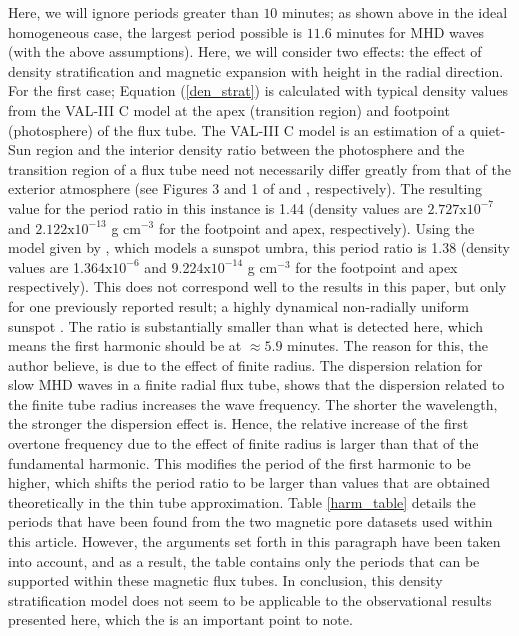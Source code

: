 	Here, we will ignore periods greater than $10$ minutes; as shown above in the ideal homogeneous case, the largest period possible is $11.6$ minutes for MHD waves (with the above assumptions).
	Here, we will consider two effects: the effect of density stratification and magnetic expansion with height in the radial direction.
	For the first case; Equation (\ref{den_strat}) is calculated with typical density values from the VAL-III C model \citep{1981ApJS...45..635V} at the apex (transition region) and footpoint (photosphere) of the flux tube.
	The VAL-III C model is an estimation of a quiet-Sun region and the interior density ratio between the photosphere and the transition region of a flux tube need not necessarily differ greatly from that of the exterior atmosphere (see Figures 3 and 1 of \citealp{GFME13a} and \citealp{GFE14}, respectively). 
	The resulting value for the period ratio in this instance is 1.44 (density values are $2.727\mathrm{x}10^{-7}$ and $2.122\mathrm{x}10^{-13}$ g cm$^{-3}$ for the footpoint and apex, respectively).
	Using the model given by \citet{Maltby1986}, which models a sunspot umbra, this period ratio is 1.38 (density values are 1.364$\mathrm{x}10^{-6}$ and 9.224$\mathrm{x}10^{-14}$ g cm$^{-3}$ for the footpoint and apex respectively).
	This does not correspond well to the results in this paper, but only for one previously reported result; a highly dynamical non-radially uniform sunspot \citep{Dorotovic2014}.
	The ratio is substantially smaller than what is detected here, which means the first harmonic should be at $\approx 5.9$ minutes.
	The reason for this, the author believe, is due to the effect of finite radius.
	The dispersion relation for slow MHD waves in a finite radial flux tube, shows that the dispersion related to the finite tube radius increases the wave frequency.
	The shorter the wavelength, the stronger the dispersion effect is.
	Hence, the relative increase of the first overtone frequency due to the effect of finite radius is larger than that of the fundamental harmonic.
	This modifies the period of the first harmonic to be higher, which shifts the period ratio to be larger than values that are obtained theoretically in the thin tube approximation.
	Table \ref{harm_table} details the periods that have been found from the two magnetic pore datasets used within this article.
	However, the arguments set forth in this paragraph have been taken into account, and as a result, the table contains only the periods that can be supported within these magnetic flux tubes.	
    In conclusion, this density stratification model does not seem to be applicable to the observational results presented here, which the is an important point to note.
    
